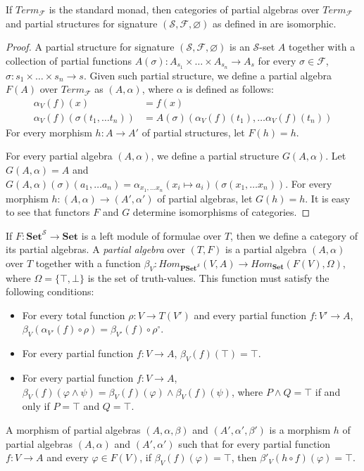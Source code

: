 \documentclass{elsarticle}
\theoremstyle{definition}
\theoremstyle{remark}
\newcommand{\cat}[1]{\mathbf{#1}}
\newcommand{\Set}{\cat{Set}}
\newcommand{\PSet}{\cat{PSet}}
\numberwithin{figure}{section}
\begin{document}
\begin{lem}
If $Term_\mathcal{F}$ is the standard monad, then categories of partial algebras over $Term_\mathcal{F}$
    and partial structures for signature $(\mathcal{S},\mathcal{F},\varnothing)$ as defined in \cite{PHL} are isomorphic.
\end{lem}
\begin{proof}
A partial structure for signature $(\mathcal{S},\mathcal{F},\varnothing)$ is an $\mathcal{S}$-set $A$ together with a collection of partial functions
    $A(\sigma) : A_{s_1} \times \ldots \times A_{s_n} \to A_s$ for every $\sigma \in \mathcal{F}$, $\sigma : s_1 \times \ldots \times s_n \to s$.
Given such partial structure, we define a partial algebra $F(A)$ over $Term_\mathcal{F}$ as $(A,\alpha)$, where $\alpha$ is defined as follows:
\begin{align*}
\alpha_V(f)(x) & = f(x) \\
\alpha_V(f)(\sigma(t_1, \ldots t_n)) & = A(\sigma)(\alpha_V(f)(t_1), \ldots \alpha_V(f)(t_n))
\end{align*}
For every morphism $h : A \to A'$ of partial structures, let $F(h) = h$.

For every partial algebra $(A,\alpha)$, we define a partial structure $G(A,\alpha)$.
Let $G(A,\alpha) = A$ and $G(A,\alpha)(\sigma)(a_1, \ldots a_n) = \alpha_{x_1, \ldots x_n}(x_i \mapsto a_i)(\sigma(x_1, \ldots x_n))$.
For every morphism $h : (A,\alpha) \to (A',\alpha')$ of partial algebras, let $G(h) = h$.
It is easy to see that functors $F$ and $G$ determine isomorphisms of categories.
\end{proof}

If $F : \Set^\mathcal{S} \to \Set$ is a left module of formulae over $T$, then we define a category of its partial algebras.
A \emph{partial algebra} over $(T,F)$ is a partial algebra $(A,\alpha)$ over $T$ together with a function $\beta_V : Hom_{\PSet^\mathcal{S}}(V,A) \to Hom_\Set(F(V),\Omega)$,
    where $\Omega = \{ \top, \bot \}$ is the set of truth-values.
This function must satisfy the following conditions:
\begin{itemize}
\item For every total function $\rho : V \to T(V')$ and every partial function $f : V' \to A$, $\beta_V(\alpha_{V'}(f) \circ \rho) = \beta_{V'}(f) \circ \rho^\circ$.
\item For every partial function $f : V \to A$, $\beta_V(f)(\top) = \top$.
\item For every partial function $f : V \to A$, $\beta_V(f)(\varphi \land \psi) = \beta_V(f)(\varphi) \land \beta_V(f)(\psi)$,
    where $P \land Q = \top$ if and only if $P = \top$ and $Q = \top$.
\end{itemize}
A morphism of partial algebras $(A,\alpha,\beta)$ and $(A',\alpha',\beta')$ is a morphism $h$ of partial algebras $(A,\alpha)$ and $(A',\alpha')$
    such that for every partial function $f : V \to A$ and every $\varphi \in F(V)$, if $\beta_V(f)(\varphi) = \top$, then $\beta'_V(h \circ f)(\varphi) = \top$.
\end{document}
